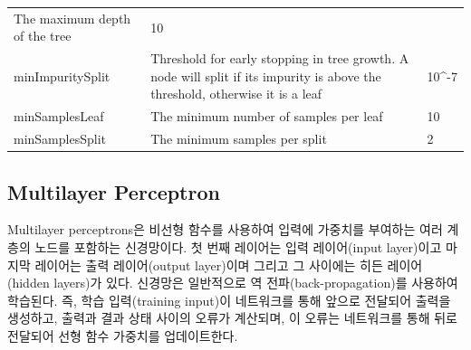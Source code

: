 \documentclass[10.5pt]{book}
\theoremstyle{definition}
\theoremstyle{definition}
\theoremstyle{definition}
\theoremstyle{remark}
\begin{document}
\begin{longtable}[]{@{}lll@{}}
\begin{minipage}[t]{0.16\columnwidth}
The maximum depth of the tree\strut
\end{minipage} & \begin{minipage}[t]{0.20\columnwidth}\raggedright\strut
10\strut
\end{minipage}\tabularnewline
\begin{minipage}[t]{0.13\columnwidth}\raggedright\strut
minImpuritySplit\strut
\end{minipage} & \begin{minipage}[t]{0.16\columnwidth}\raggedright\strut
Threshold for early stopping in tree growth. A node will split if its
impurity is above the threshold, otherwise it is a leaf\strut
\end{minipage} & \begin{minipage}[t]{0.20\columnwidth}\raggedright\strut
10\^{}-7\strut
\end{minipage}\tabularnewline
\begin{minipage}[t]{0.13\columnwidth}\raggedright\strut
minSamplesLeaf\strut
\end{minipage} & \begin{minipage}[t]{0.16\columnwidth}\raggedright\strut
The minimum number of samples per leaf\strut
\end{minipage} & \begin{minipage}[t]{0.20\columnwidth}\raggedright\strut
10\strut
\end{minipage}\tabularnewline
\begin{minipage}[t]{0.13\columnwidth}\raggedright\strut
minSamplesSplit\strut
\end{minipage} & \begin{minipage}[t]{0.16\columnwidth}\raggedright\strut
The minimum samples per split\strut
\end{minipage} & \begin{minipage}[t]{0.20\columnwidth}\raggedright\strut
2\strut
\end{minipage}\tabularnewline
\bottomrule
\end{longtable}

\subsection{Multilayer Perceptron}\label{multilayer-perceptron}

Multilayer perceptrons은 비선형 함수를 사용하여 입력에 가중치를 부여하는
여러 계층의 노드를 포함하는 신경망이다. 첫 번째 레이어는 입력
레이어(input layer)이고 마지막 레이어는 출력 레이어(output layer)이며
그리고 그 사이에는 히든 레이어(hidden layers)가 있다. 신경망은
일반적으로 역 전파(back-propagation)를 사용하여 학습된다. 즉, 학습
입력(training input)이 네트워크를 통해 앞으로 전달되어 출력을 생성하고,
출력과 결과 상태 사이의 오류가 계산되며, 이 오류는 네트워크를 통해 뒤로
전달되어 선형 함수 가중치를 업데이트한다. 
 
\end{document}
